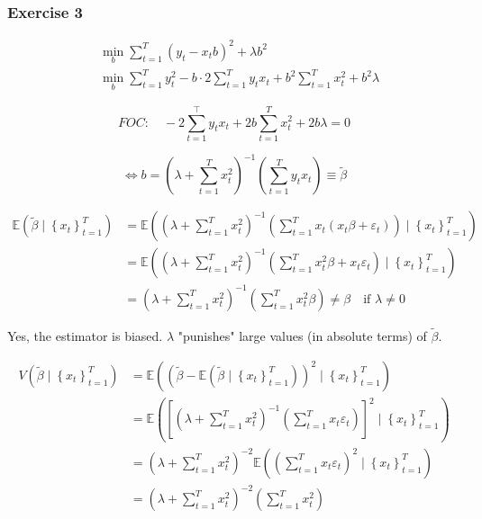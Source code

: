 {{\subsubsection*{Exercise 3}

\begin{enumerate}[label=(\alph*)]
{\item 
$$
\begin{aligned}
& \min _{b} \sum_{t=1}^{T}\left(y_{t}-x_{t} b\right)^{2}+\lambda b^{2} \\
& \min _{b} \sum_{t=1}^{T} y_{t}^{2}-b \cdot 2 \sum_{t=1}^{T} y_{t} x_{t}+b^{2} \sum_{t=1}^{T} x_{t}^{2}+b^{2} \lambda
\end{aligned}
$$

$$
F O C: \quad-2 \sum_{t=1}^{\top} y_{t} x_{t}+2 b \sum_{t=1}^{T} x_{t}^{2}+2 b \lambda=0
$$

$$
\Leftrightarrow b=\left(\lambda+\sum_{t=1}^{T} x_{t}^{2}\right)^{-1}\left(\sum_{t=1}^{T} y_{t} x_{t}\right) \equiv \tilde{\beta}
$$
}
{\item 
$$
\begin{aligned}
\mathbb{E}\left(\tilde{\beta} \mid \left\{ x_{t}\right\}_{t=1}^{T}\right) & =\mathbb{E}\left(\left(\lambda+\sum_{t=1}^{T} x_{t}^{2}\right)^{-1}\left(\sum_{t=1}^{T} x_{t}\left(x_{t} \beta+\varepsilon_{t}\right)\right) \mid \left\{ x_{t}\right\}_{t=1}^{T}\right) \\
& =\mathbb{E}\left(\left(\lambda+\sum_{t=1}^{T} x_{t}^{2}\right)^{-1}\left(\sum_{t=1}^{T} x_{t}^{2} \beta+x_{t} \varepsilon_{t}\right) \mid \left\{ x_{t}\right\}_{t=1}^{T}\right) \\
& =\left(\lambda+\sum_{t=1}^{T} x_{t}^{2}\right)^{-1}\left(\sum_{t=1}^{T} x_{t}^{2} \beta\right) \neq \beta \quad \text{if } \lambda \neq 0
\end{aligned}
$$

Yes, the estimator is biased. $\lambda$ "punishes" large values (in absolute terms) of $\tilde{\beta}$.
}
{\item 
$$
\begin{aligned}
V\left(\tilde{\beta}\mid \left\{ x_{t}\right\}_{t=1}^{T}\right) & =\mathbb{E}\left(\left(\tilde{\beta}-\mathbb{E}\left(\tilde{\beta} \mid \left\{ x_{t}\right\}_{t=1}^{T}\right)\right)^{2} \mid \left\{ x_{t}\right\}_{t=1}^{T}\right) \\
& =\mathbb{E}\left(\left[\left(\lambda+\sum_{t=1}^{T} x_{t}^{2}\right)^{-1}\left(\sum_{t=1}^{T} x_{t} \varepsilon_{t}\right)\right]^{2} \mid \left\{ x_{t}\right\}_{t=1}^{T}\right) \\
& =\left(\lambda+\sum_{t=1}^{T} x_{t}^{2}\right)^{-2} \mathbb{E}\left(\left(\sum_{t=1}^{T} x_{t} \varepsilon_{t}\right)^{2} \mid \left\{ x_{t}\right\}_{t=1}^{T}\right) \\
& =\left(\lambda+\sum_{t=1}^{T} x_{t}^{2}\right)^{-2}\left(\sum_{t=1}^{T} x_{t}^{2}\right)
\end{aligned}
$$

}
\end{enumerate}}}
